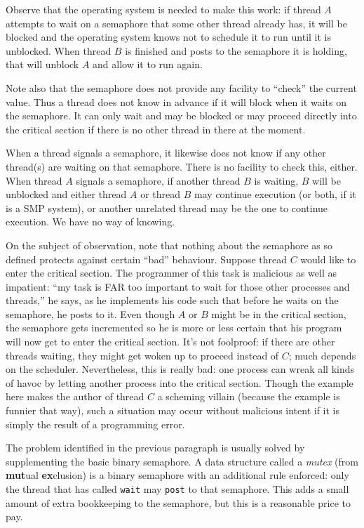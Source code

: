 Observe that the operating system is needed to make this work: if thread $A$ attempts to wait on a semaphore that some other thread already has, it will be blocked and the operating system knows not to schedule it to run until it is unblocked. When thread $B$ is finished and posts to the semaphore it is holding, that will unblock $A$ and allow it to run again.

Note also that the semaphore does not provide any facility to ``check'' the current value. Thus a thread does not know in advance if it will block when it waits on the semaphore. It can only wait and may be blocked or may proceed directly into the critical section if there is no other thread in there at the moment.

When a thread signals a semaphore, it likewise does not know if any other thread(s) are waiting on that semaphore. There is no facility to check this, either. When thread $A$ signals a semaphore, if another thread $B$ is waiting, $B$ will be unblocked and either thread $A$ or thread $B$ may continue execution (or both, if it is a SMP system), or another unrelated thread may be the one to continue execution. We have no way of knowing.

On the subject of observation, note that nothing about the semaphore as so defined protects against certain ``bad'' behaviour. Suppose thread $C$ would like to enter the critical section. The programmer of this task is malicious as well as impatient: ``my task is FAR too important to wait for those other processes and threads,'' he says, as he implements his code such that before he waits on the semaphore, he posts to it. Even though $A$ or $B$ might be in the critical section, the semaphore gets incremented so he is more or less certain that his program will now get to enter the critical section. It's not foolproof: if there are other threads waiting, they might get woken up to proceed instead of $C$; much depends on the scheduler. Nevertheless, this is really bad: one process can wreak all kinds of havoc by letting another process into the critical section. Though the example here makes the author of thread $C$ a scheming villain (because the example is funnier that way), such a situation may occur without malicious intent if it is simply the result of a programming error.

The problem identified in the previous paragraph is usually solved by supplementing the basic binary semaphore. A data structure called a \textit{mutex} (from \textbf{mut}ual \textbf{ex}clusion) is a binary semaphore with an additional rule enforced: only the thread that has called \texttt{wait} may \texttt{post} to that semaphore. This adds a small amount of extra bookkeeping to the semaphore, but this is a reasonable price to pay.

